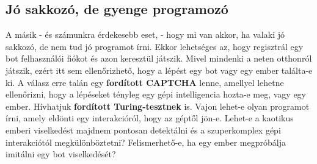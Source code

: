 \documentclass[twoside, a4paper, 12pt]{book}
\begin{document}
\subsection{Jó sakkozó, de gyenge programozó}A másik - és számunkra érdekesebb eset, - hogy mi van akkor, ha valaki jó sakkozó, de nem tud jó programot írni. Ekkor lehetséges az, hogy regisztrál egy bot felhasználói fiókot és azon keresztül játszik. Mivel mindenki a neten otthonról játszik, ezért itt sem ellenőrizhető, hogy a lépést egy bot vagy egy ember találta-e ki. A válasz erre talán egy \textbf{fordított CAPTCHA} lenne, amellyel lehetne ellenőrizni, hogy a lépéseket tényleg egy gépi intelligencia hozta-e meg, vagy egy ember. Hívhatjuk \textbf{fordított Turing-tesztnek} is. Vajon lehet-e olyan programot írni, amely eldönti egy interakcióról, hogy az géptől jön-e. Lehet-e a kaotikus emberi viselkedést majdnem pontosan detektálni és a szuperkomplex gépi interakciótól megkülönböztetni? Felismerhető-e, ha egy ember megpróbálja imitálni egy bot viselkedését?








































\backmatter


\end{document}
